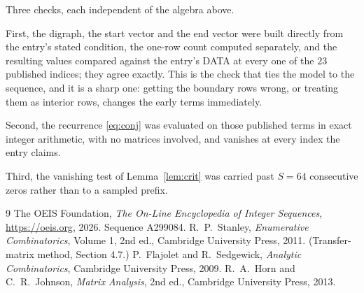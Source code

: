 \documentclass[11pt,a4paper]{article}
\theoremstyle{plain}
\theoremstyle{definition}
\begin{document}
Three checks, each independent of the algebra above.

First, the digraph, the start vector and the end vector were built directly from the
entry's stated condition, the one-row count computed separately, and the resulting values
compared against the entry's DATA at every one of the $23$ published indices; they
agree exactly. This is the check that ties the model to the sequence, and it is a sharp one:
getting the boundary rows wrong, or treating them as interior rows, changes the early terms
immediately.

Second, the recurrence \eqref{eq:conj} was evaluated on those published terms in exact
integer arithmetic, with no matrices involved, and vanishes at every index the entry claims.

Third, the vanishing test of Lemma~\ref{lem:crit} was carried past $S=64$ consecutive
zeros rather than to a sampled prefix.

\begin{thebibliography}{9}
 The OEIS Foundation, \emph{The On-Line Encyclopedia of Integer
Sequences}, \url{https://oeis.org}, 2026. Sequence A299084.
 R.~P.~Stanley, \emph{Enumerative Combinatorics}, Volume 1, 2nd ed.,
Cambridge University Press, 2011. (Transfer-matrix method, Section 4.7.)
 P.~Flajolet and R.~Sedgewick, \emph{Analytic Combinatorics}, Cambridge
University Press, 2009.
 R.~A.~Horn and C.~R.~Johnson, \emph{Matrix Analysis}, 2nd ed., Cambridge
University Press, 2013.
\end{thebibliography}
\end{document}
